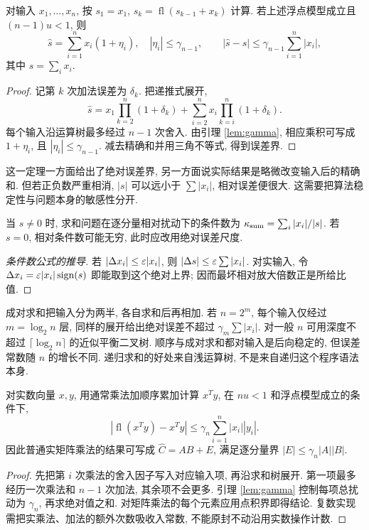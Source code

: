 \begin{theorem}[顺序求和]\label{thm:sum}
对输入 $x_1,\ldots,x_n$, 按 $s_1=x_1$, $s_k=\operatorname{fl}(s_{k-1}+x_k)$ 计算. 若上述浮点模型成立且 $(n-1)u<1$, 则
\[
\widehat s=\sum_{i=1}^n x_i(1+\eta_i),\quad |\eta_i|\le\gamma_{n-1},
\qquad
|\widehat s-s|\le\gamma_{n-1}\sum_{i=1}^n|x_i|,
\]
其中 $s=\sum_i x_i$.
\end{theorem}
\begin{proof}
记第 $k$ 次加法误差为 $\delta_k$. 把递推式展开,
\[
\widehat s=x_1\prod_{k=2}^n(1+\delta_k)
+\sum_{i=2}^n x_i\prod_{k=i}^n(1+\delta_k).
\]
每个输入沿运算树最多经过 $n-1$ 次舍入. 由引理 \ref{lem:gamma}, 相应乘积可写成 $1+\eta_i$, 且 $|\eta_i|\le\gamma_{n-1}$. 减去精确和并用三角不等式, 得到误差界.
\end{proof}
这一定理一方面给出了绝对误差界, 另一方面说实际结果是略微改变输入后的精确和. 但若正负数严重相消, $|s|$ 可以远小于 $\sum|x_i|$, 相对误差便很大. 这需要把算法稳定性与问题本身的敏感性分开.

\begin{definition}
当 $s\ne0$ 时, 求和问题在逐分量相对扰动下的条件数为 $\kappa_{\rm sum}=\sum_i|x_i|/|s|$. 若 $s=0$, 相对条件数可能无穷, 此时应改用绝对误差尺度.
\end{definition}
\begin{proof}[条件数公式的推导]
若 $|\Delta x_i|\le\varepsilon|x_i|$, 则 $|\Delta s|\le\varepsilon\sum|x_i|$. 对实输入, 令 $\Delta x_i=\varepsilon|x_i|\operatorname{sign}(s)$ 即能取到这个绝对上界; 因而最坏相对放大倍数正是所给比值.
\end{proof}
成对求和把输入分为两半, 各自求和后再相加. 若 $n=2^m$, 每个输入仅经过 $m=\log_2 n$ 层, 同样的展开给出绝对误差不超过 $\gamma_m\sum|x_i|$. 对一般 $n$ 可用深度不超过 $\lceil\log_2n\rceil$ 的近似平衡二叉树. 顺序与成对求和都对输入是后向稳定的, 但误差常数随 $n$ 的增长不同. 递归求和的好处来自浅运算树, 不是来自递归这个程序语法本身.

\begin{proposition}[点积与矩阵乘法]\label{prop:dot}
对实数向量 $x,y$, 用通常乘法加顺序累加计算 $x^Ty$, 在 $nu<1$ 和浮点模型成立的条件下,
\[
|\operatorname{fl}(x^Ty)-x^Ty|\le\gamma_n\sum_{i=1}^n|x_i||y_i|.
\]
因此普通实矩阵乘法的结果可写成 $\widehat C=AB+E$, 满足逐分量界 $|E|\le\gamma_n|A||B|$.
\end{proposition}
\begin{proof}
先把第 $i$ 次乘法的舍入因子写入对应输入项, 再沿求和树展开. 第一项最多经历一次乘法和 $n-1$ 次加法, 其余项不会更多. 引理 \ref{lem:gamma} 控制每项总扰动为 $\gamma_n$, 再求绝对值之和. 对矩阵乘法的每个元素应用点积界即得结论. 复数实现需把实乘法、加法的额外次数吸收入常数, 不能原封不动沿用实数操作计数.
\end{proof}

